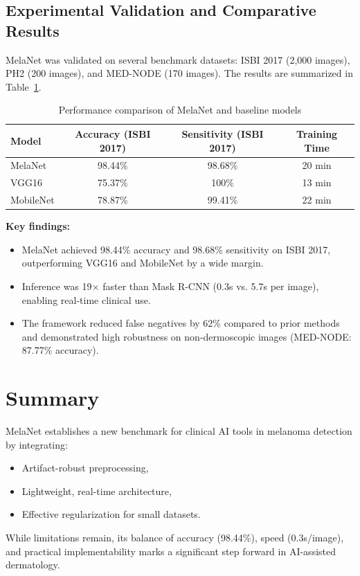 \documentclass[a4paper,12pt]{report}
\begin{document}
\begin{spacing}{1.5}
    \subsection*{Experimental Validation and Comparative Results}
    
    MelaNet was validated on several benchmark datasets: ISBI 2017 (2,000 images), PH2 (200 images), and MED-NODE (170 images). The results are summarized in Table~\ref{tab:melanet_performance}.
    
    \begin{table}[H]
    \centering
    \caption{Performance comparison of MelaNet and baseline models}
    \label{tab:melanet_performance}
    \begin{tabular}{|l|c|c|c|}
    \hline
    \textbf{Model} & \textbf{Accuracy (ISBI 2017)} & \textbf{Sensitivity (ISBI 2017)} & \textbf{Training Time} \\
    \hline
    MelaNet & 98.44\% & 98.68\% & 20 min \\
    VGG16   & 75.37\% & 100\%   & 13 min \\
    MobileNet & 78.87\% & 99.41\% & 22 min \\
    \hline
    \end{tabular}
    \end{table}
    
    \textbf{Key findings:}
    \begin{itemize}
        \item MelaNet achieved 98.44\% accuracy and 98.68\% sensitivity on ISBI 2017, outperforming VGG16 and MobileNet by a wide margin.
        \item Inference was 19$\times$ faster than Mask R-CNN (0.3s vs. 5.7s per image), enabling real-time clinical use.
        \item The framework reduced false negatives by 62\% compared to prior methods and demonstrated high robustness on non-dermoscopic images (MED-NODE: 87.77\% accuracy).
    \end{itemize}
    
    \section{Summary}
    
    MelaNet establishes a new benchmark for clinical AI tools in melanoma detection by integrating:
    \begin{itemize}
        \item Artifact-robust preprocessing,
        \item Lightweight, real-time architecture,
        \item Effective regularization for small datasets.
    \end{itemize}
    While limitations remain, its balance of accuracy (98.44\%), speed (0.3s/image), and practical implementability marks a significant step forward in AI-assisted dermatology.


\end{spacing}
\end{document}

